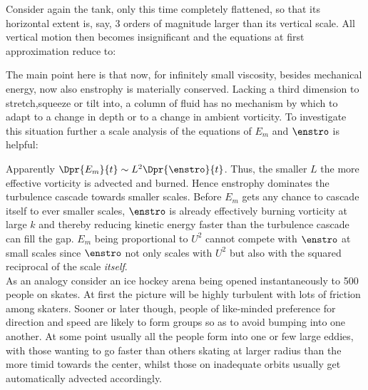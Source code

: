 \begin{turbu}\label{turb:smallaspect}
Consider again the tank, only this time completely flattened, so that its horizontal extent is, say, 3 orders of magnitude larger than its vertical scale. All
vertical motion then becomes insignificant and the equations at first approximation reduce to:

The main point here is that now, for infinitely small viscosity, besides mechanical energy, now also enstrophy is materially conserved. Lacking a third
dimension to stretch,squeeze or tilt into, a column of fluid has no mechanism by which to adapt to a change in depth or to a change in ambient vorticity. To
investigate this situation further a scale analysis of the equations of $E_{m}$ and $\enstro$ is helpful:

Apparently $\Dpr{E_{m}}{t} \sim L^{2}\Dpr{\enstro}{t} $. Thus, the smaller $L$ the more effective vorticity is advected and burned. Hence enstrophy dominates
the turbulence cascade towards smaller scales. Before $E_{m}$ gets any chance to cascade itself to ever smaller scales, $\enstro$ is already effectively burning
vorticity at large $k$ and thereby reducing kinetic energy faster than the turbulence cascade can fill the gap. $E_{m}$ being proportional to $U^{2}$ cannot
compete with $\enstro$ at small scales since $\enstro$ not only scales with $U^{2}$ but also with the squared reciprocal of the scale  \textit{itself}.  \\
As an analogy consider an ice hockey arena being opened instantaneously to 500 people on skates. At first the picture will be highly turbulent with lots of
friction among skaters. Sooner or later though, people of like-minded preference for direction and speed are likely to form groups so as to avoid bumping into
one another. At some point usually all the people form into one or few large eddies, with those wanting to go faster than others skating at larger radius than
the more timid towards the center, whilst those on inadequate orbits usually get automatically advected accordingly.
\end{turbu}

